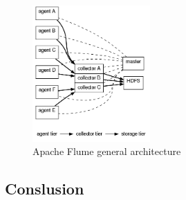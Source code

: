 \begin{description}
{    \begin{figure}[H]
     \centering
     \includegraphics[width=0.4\textwidth]{images/flume-architecture.png}
         \caption{Apache Flume general architecture \cite{apacheflumeDoc}}
        \label{fig:flume-architecture}
    \end{figure}

    }
\end{description}

\begin{landscape}
\section{Conslusion}

\end{landscape}

